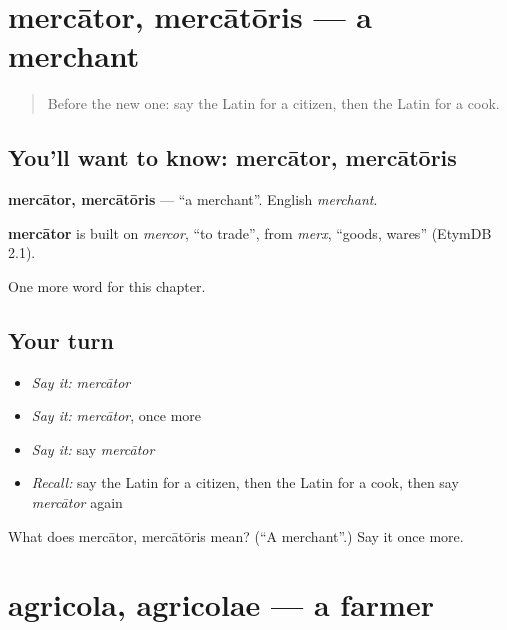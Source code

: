 \section[mercātor, mercātōris]{mercātor, mercātōris — a merchant}

\label{lesson:LA-C74-mercator}



\begin{quote}
Before the new one: say the Latin for a citizen, then the Latin for a cook.
\end{quote}

\subsection*{You'll want to know: mercātor, mercātōris}
\textbf{mercātor, mercātōris} — \textquotedblleft{}a merchant\textquotedblright{}. English \emph{merchant}.

\begin{cousinweb}
\textbf{mercātor} is built on \emph{mercor}, \textquotedblleft{}to trade\textquotedblright{}, from \emph{merx}, \textquotedblleft{}goods, wares\textquotedblright{} (EtymDB 2.1).
\end{cousinweb}

\begin{grammarlens}[title={What you've built}]
One more word for this chapter.
\end{grammarlens}

\subsection*{Your turn}
\begin{itemize}
\raggedright
  \item \emph{Say it:} \emph{mercātor}
  \item \emph{Say it:} \emph{mercātor}, once more
  \item \emph{Say it:} say \emph{mercātor}
  \item \emph{Recall:} say the Latin for a citizen, then the Latin for a cook, then say \emph{mercātor} again
\end{itemize}

\begin{tcolorbox}[breakable,colback=teal!4,colframe=teal!35!black,title={Before you move on}]
What does mercātor, mercātōris mean? (\textquotedblleft{}A merchant\textquotedblright{}.) Say it once more.
\end{tcolorbox}
\section[agricola, agricolae]{agricola, agricolae — a farmer}

